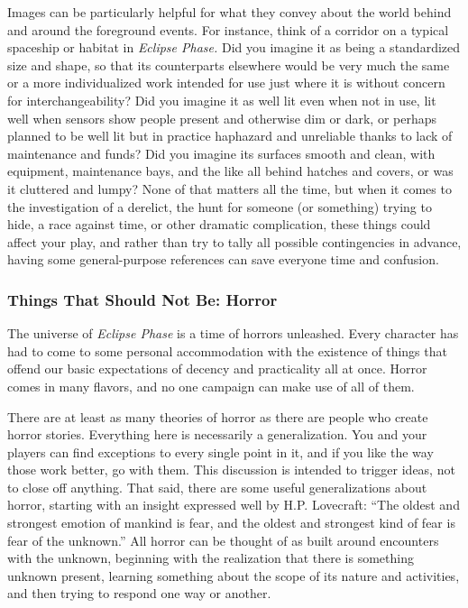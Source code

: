 Images can be particularly helpful for what they 
convey about the world behind and around the 
foreground events. For instance, think of a corridor 
on a typical spaceship or habitat in \textit{Eclipse Phase. }
Did you imagine it as being a standardized size and 
shape, so that its counterparts elsewhere would be 
very much the same or a more individualized work 
intended for use just where it is without concern 
for interchangeability? Did you imagine it as well 
lit even when not in use, lit well when sensors show 
people present and otherwise dim or dark, or perhaps 
planned to be well lit but in practice haphazard and 
unreliable thanks to lack of maintenance and funds? 
Did you imagine its surfaces smooth and clean, with 
equipment, maintenance bays, and the like all behind 
hatches and covers, or was it cluttered and lumpy? 
None of that matters all the time, but when it comes 
to the investigation of a derelict, the hunt for someone 
(or something) trying to hide, a race against time, or 
other dramatic complication, these things could affect 
your play, and rather than try to tally all possible contingencies
in advance, having some general-purpose
references can save everyone time and confusion. 

\subsubsection{Things That Should Not Be: Horror }

The universe of \textit{Eclipse Phase} is a time of horrors 
unleashed. Every character has had to come to some 
personal accommodation with the existence of things 
that offend our basic expectations of decency and 
practicality all at once. Horror comes in many flavors, 
and no one campaign can make use of all of them.

There are at least as many theories of horror as 
there are people who create horror stories. Everything 
here is necessarily a generalization. You and your 
players can find exceptions to every single point in 
it, and if you like the way those work better, go with 
them. This discussion is intended to trigger ideas, not 
to close off anything. That said, there are some useful 
generalizations about horror, starting with an insight 
expressed well by H.P. Lovecraft: ``The oldest and 
strongest emotion of mankind is fear, and the oldest 
and strongest kind of fear is fear of the unknown.'' All 
horror can be thought of as built around encounters 
with the unknown, beginning with the realization that 
there is something unknown present, learning something
about the scope of its nature and activities, and
then trying to respond one way or another. 

